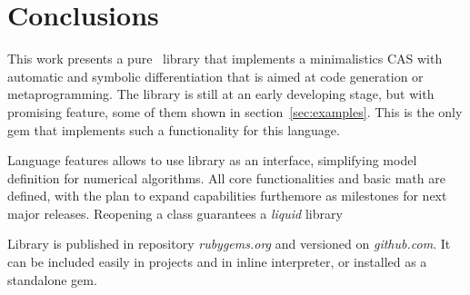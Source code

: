
\section{Conclusions}
\label{sec:conclusions}

This work presents a pure \Ruby~library that implements a minimalistics CAS with
automatic and symbolic differentiation that is aimed at code generation or metaprogramming.
The library is still at an early developing stage, but with promising feature, some of them
shown in section~\ref{sec:examples}. This is the only gem that implements
such a functionality for this language.

Language features allows to use library as an interface, simplifying model definition
for numerical algorithms. All core functionalities and basic math are defined, with the plan to expand
capabilities furthemore as milestones for next major releases. Reopening a class guarantees a
\emph{liquid} library 

Library is published in repository \emph{rubygems.org} and versioned on \emph{github.com}. It can be included easily in projects and in inline interpreter, or installed as a standalone gem.
